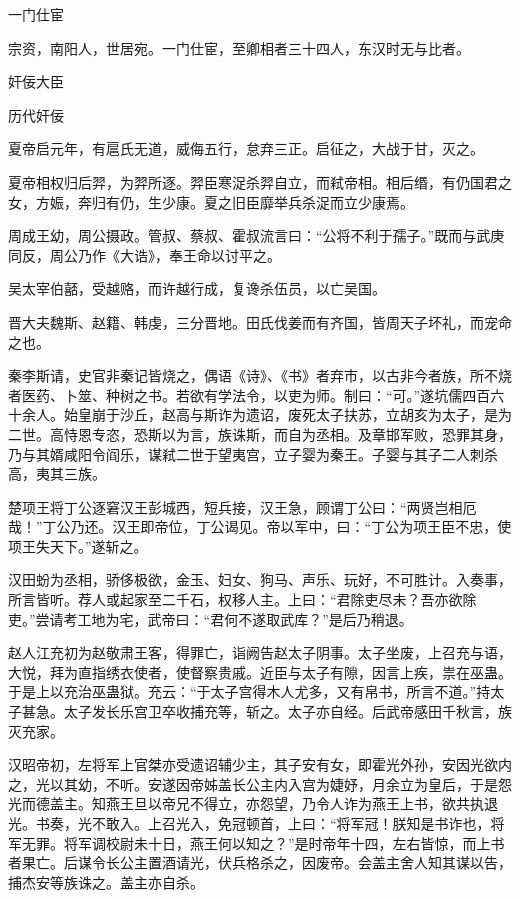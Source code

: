 \documentclass[a4paper,12pt,UTF8,twoside]{ctexbook}
\begin{document}
    一门仕宦
    
    宗资，南阳人，世居宛。一门仕宦，至卿相者三十四人，东汉时无与比者。
    
    奸佞大臣
    
    历代奸佞
    
    夏帝启元年，有扈氏无道，威侮五行，怠弃三正。启征之，大战于甘，灭之。
    
    夏帝相权归后羿，为羿所逐。羿臣寒浞杀羿自立，而弒帝相。相后缗，有仍国君之女，方娠，奔归有仍，生少康。夏之旧臣靡举兵杀浞而立少康焉。
    
    周成王幼，周公摄政。管叔、蔡叔、霍叔流言曰：“公将不利于孺子。”既而与武庚同反，周公乃作《大诰》，奉王命以讨平之。
    
    吴太宰伯嚭，受越赂，而许越行成，复谗杀伍员，以亡吴国。
    
    晋大夫魏斯、赵籍、韩虔，三分晋地。田氏伐姜而有齐国，皆周天子坏礼，而宠命之也。
    
    秦李斯请，史官非秦记皆烧之，偶语《诗》、《书》者弃市，以古非今者族，所不烧者医药、卜筮、种树之书。若欲有学法令，以吏为师。制曰：“可。”遂坑儒四百六十余人。始皇崩于沙丘，赵高与斯诈为遗诏，废死太子扶苏，立胡亥为太子，是为二世。高恃恩专恣，恐斯以为言，族诛斯，而自为丞相。及章邯军败，恐罪其身，乃与其婿咸阳令阎乐，谋弒二世于望夷宫，立子婴为秦王。子婴与其子二人刺杀高，夷其三族。
    
    楚项王将丁公逐窘汉王彭城西，短兵接，汉王急，顾谓丁公曰：“两贤岂相厄哉！”丁公乃还。汉王即帝位，丁公谒见。帝以军中，曰：“丁公为项王臣不忠，使项王失天下。”遂斩之。
    
    汉田蚡为丞相，骄侈极欲，金玉、妇女、狗马、声乐、玩好，不可胜计。入奏事，所言皆听。荐人或起家至二千石，权移人主。上曰：“君除吏尽未？吾亦欲除吏。”尝请考工地为宅，武帝曰：“君何不遂取武库？”是后乃稍退。
    
    赵人江充初为赵敬肃王客，得罪亡，诣阙告赵太子阴事。太子坐废，上召充与语，大悦，拜为直指绣衣使者，使督察贵戚。近臣与太子有隙，因言上疾，祟在巫蛊。于是上以充治巫蛊狱。充云：“于太子宫得木人尤多，又有帛书，所言不道。”持太子甚急。太子发长乐宫卫卒收捕充等，斩之。太子亦自经。后武帝感田千秋言，族灭充家。
    
    汉昭帝初，左将军上官桀亦受遗诏辅少主，其子安有女，即霍光外孙，安因光欲内之，光以其幼，不听。安遂因帝姊盖长公主内入宫为婕妤，月余立为皇后，于是怨光而德盖主。知燕王旦以帝兄不得立，亦怨望，乃令人诈为燕王上书，欲共执退光。书奏，光不敢入。上召光入，免冠顿首，上曰：“将军冠！朕知是书诈也，将军无罪。将军调校尉未十日，燕王何以知之？”是时帝年十四，左右皆惊，而上书者果亡。后谋令长公主置酒请光，伏兵格杀之，因废帝。会盖主舍人知其谋以告，捕杰安等族诛之。盖主亦自杀。
    
\end{document}
